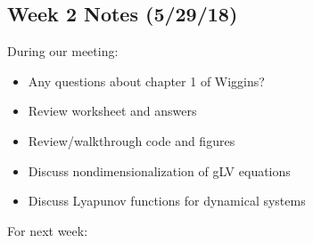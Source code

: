 \documentclass[]{article}
\date{}
\def\tightlist{}
\begin{document}
\subsection{Week 2 Notes (5/29/18)}\label{week-2-notes-52918}

During our meeting:

\begin{itemize}
\tightlist
\item
  Any questions about chapter 1 of Wiggins?
\item
  Review worksheet and answers
\item
  Review/walkthrough code and figures
\item
  Discuss nondimensionalization of gLV equations
\item
  Discuss Lyapunov functions for dynamical systems
\end{itemize}

For next week:
\end{document}
